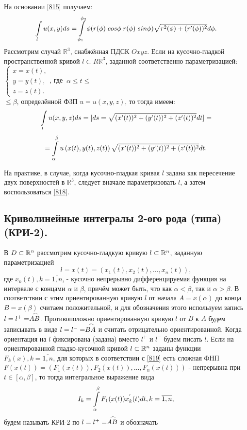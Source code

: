 На основании \eqref{815} получаем:
\begin{equation}
\label{817}
\displaystyle\int\limits_l u(x,y) ds = \displaystyle\int\limits_{\phi_1}^{\phi_2} \phi (r(\phi) \; cos \phi \; r(\phi) \; sin \phi) \sqrt{r^2(\phi) + (r'(\phi))^2} d \phi.
\end{equation}
Рассмотрим случай $\mathbb{R}^3$, снабжённая ПДСК $Oxyz$. Если на кусочно-гладкой пространственной кривой $l \subset R\mathbb{R}^3$, заданной соответственно параметризацией: $\begin{cases}
x = x(t), \\ y = y(t), \\ z = z(t). \end{cases}$, где $\ \alpha \leqslant t \leqslant$ \\ $\leqslant \beta$, определённой Ф3П $u = u(x,y,z)$, то тогда имеем:
\begin{equation*}
\displaystyle\int\limits_l u(x,y,z) ds = [ds = \sqrt{(x'(t))^2 + (y'(t))^2 + (z'(t))^2} dt] =
\end{equation*}
\begin{equation}
\label{818}
= \displaystyle\int\limits_\alpha^\beta u\left(x(t), y(t), z(t)\right) \sqrt{(x'(t))^2 + (y'(t))^2 + (z'(t))^2} dt.
\end{equation}

На практике, в случае, когда кусочно-гладкая кривая $l$ задана как пересечение двух поверхностей в $\mathbb{R}^3$, следует вначале параметризовать $l$, а затем воспользоваться \eqref{818}.

\subsection{Криволинейные интегралы 2-ого рода (типа) (КРИ-2).}
В $D \subset \mathbb{R}^n$ рассмотрим кусочно-гладкую кривую $l \subset \mathbb{R}^n$, заданную параметризацией
\begin{equation}
\label{819}
l = x(t) = \left(x_1(t), x_2(t), \ldots, x_n(t)\right),
\end{equation}
где $x_k(t), k = \overline{1,n}$, - кусочно непрерывно дифференцируемая функция на интервале с концами $\alpha$ и $\beta$, причём может быть, что как $\alpha < \beta$, так и $\alpha > \beta$. В соответствии с этим ориентированную кривую $l$ от начала $A = x(\alpha)$ до конца $B = x(\beta)$ считаем положительной, и для обозначения этого используем запись $l = l^{+} = \arc{AB}$. Противоположно ориентированную кривую $l$ от $B$ к $A$ будем записывать в виде $l = l^{-} = \arc{BA}$ и считать отрицательно ориентированной. Когда ориентация на $l$ фиксирована (задана) вместо $l^{+}$ и $l^{-}$ будем писать $l$. Если на ориентированной гладко-кусочной кривой $l \subset \mathbb{R}^n$ заданы функции $F_k(x), k = \overline{1,n}$, для которых в соответствии с \eqref{819} есть сложная ФНП $F(x(t)) = (F_1(x(t)), F_2(x(t)), \ldots, F_n(x(t)))$ - непрерывна при $t \in [\alpha,\beta]$, то тогда интегральное выражение вида
\begin{equation}
\label{820}
I_k = \displaystyle\int\limits_{\alpha}^{\beta} F_1(x(t)) x_k^{'}(t) dt, k = \overline{1,n},
\end{equation}
будем называть КРИ-2 по $l = l^{+} = \arc{AB}$ и обозначать

